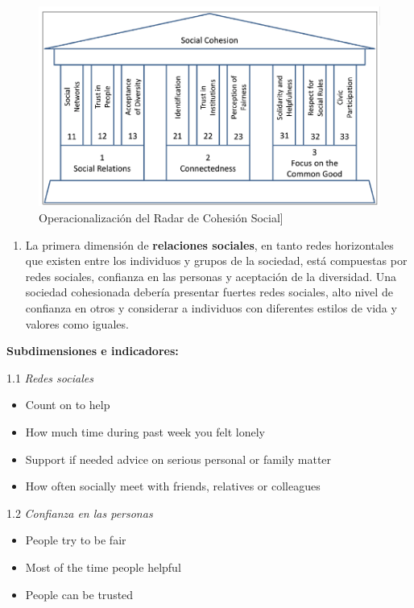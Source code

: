 \documentclass[
  12pt,
]{book}
\providecommand{\tightlist}{%
  \setlength{\itemsep}{0pt}\setlength{\parskip}{0pt}}
\begin{document}
\begin{figure}[H]

{\centering \includegraphics[width=0.75\linewidth]{inputs/images/radar} 

}

\caption{Operacionalización del Radar de Cohesión Social]}\label{fig:radar}
\end{figure}

\begin{enumerate}
\def\labelenumi{\arabic{enumi}.}
\tightlist
\item
  La primera dimensión de \textbf{relaciones sociales}, en tanto redes horizontales que existen entre los individuos y grupos de la sociedad, está compuestas por redes sociales, confianza en las personas y aceptación de la diversidad. Una sociedad cohesionada debería presentar fuertes redes sociales, alto nivel de confianza en otros y considerar a individuos con diferentes estilos de vida y valores como iguales.
\end{enumerate}

\textbf{Subdimensiones e indicadores:}

1.1 \emph{Redes sociales}

\begin{itemize}
\tightlist
\item
  Count on to help
\item
  How much time during past week you felt lonely
\item
  Support if needed advice on serious personal or family matter
\item
  How often socially meet with friends, relatives or colleagues
\end{itemize}

1.2 \emph{Confianza en las personas}

\begin{itemize}
\tightlist
\item
  People try to be fair
\item
  Most of the time people helpful
\item
  People can be trusted
\end{itemize}
\end{document}
